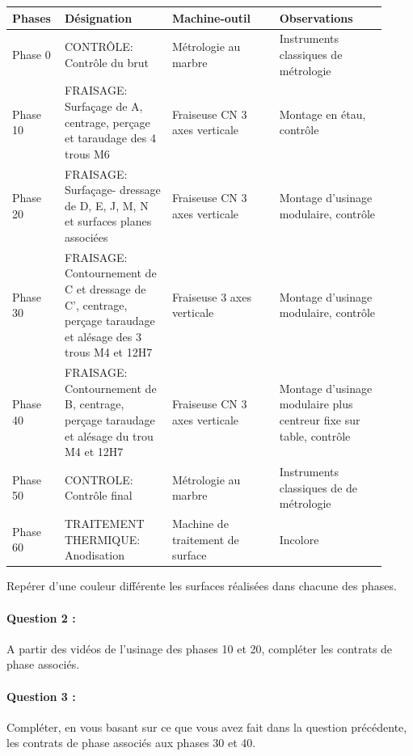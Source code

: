 \begin{table}[!h]
 \begin{tabular}{|m{0.11\linewidth}|m{0.27\linewidth}|m{0.27\linewidth}|m{0.27\linewidth}|}
 \hline
 Phases & Désignation & Machine-outil & Observations \\
 \hline
 Phase 0 & CONTRÔLE: Contrôle du brut & Métrologie au marbre & Instruments classiques de métrologie \\
 \hline
 Phase 10 & FRAISAGE: Surfaçage de A, centrage, perçage et taraudage des 4 trous M6 & Fraiseuse CN 3 axes verticale & Montage en étau, contrôle \\
 \hline
 Phase 20 & FRAISAGE: Surfaçage- dressage de D, E, J, M, N et surfaces planes associées & Fraiseuse CN 3 axes verticale & Montage d'usinage modulaire, contrôle \\
 \hline
 Phase 30 & FRAISAGE: Contournement de C et dressage de C', centrage, perçage taraudage et alésage des 3 trous M4 et 12H7 & Fraiseuse 3 axes verticale & Montage d'usinage modulaire, contrôle \\
 \hline
 Phase 40 & FRAISAGE: Contournement de B, centrage, perçage taraudage et alésage du trou M4 et 12H7 & Fraiseuse CN 3 axes verticale & Montage d'usinage modulaire plus centreur fixe sur table, contrôle \\
 \hline
 Phase 50 & CONTROLE: Contrôle final & Métrologie au marbre & Instruments classiques de de métrologie \\
 \hline
 Phase 60 & TRAITEMENT THERMIQUE: Anodisation & Machine de traitement de surface & Incolore \\
 \hline
 \end{tabular}
\end{table}

\normalsize

Repérer d'une couleur différente les surfaces réalisées dans chacune des phases.

\paragraph{Question 2 :} A partir des vidéos de l'usinage des phases 10 et 20, compléter les contrats de
phase associés.

\paragraph{Question 3 :} Compléter, en vous basant sur ce que vous avez fait dans la question précédente, les contrats de phase associés aux phases 30 et 40.

